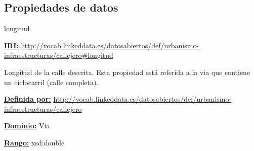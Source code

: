 \subsection{Propiedades de datos}


\begin{mybox}{longitud}
\begin{flushleft}
\underline{\textbf{IRI:}}
\url{http://vocab.linkeddata.es/datosabiertos/def/urbanismo-infraestructuras/callejero#longitud}
\newline

Longitud de la calle descrita. Esta propiedad está referida a la via que contiene un ciclocarril (calle completa).
\newline

\underline{\textbf{Definida por:}}\newline
\url{http://vocab.linkeddata.es/datosabiertos/def/urbanismo-infraestructuras/callejero}
\newline

\underline{\textbf{Dominio:}}
	Via
\newline

\underline{\textbf{Rango:}}
		xsd:double
\newline

\end{flushleft}
\end{mybox}



